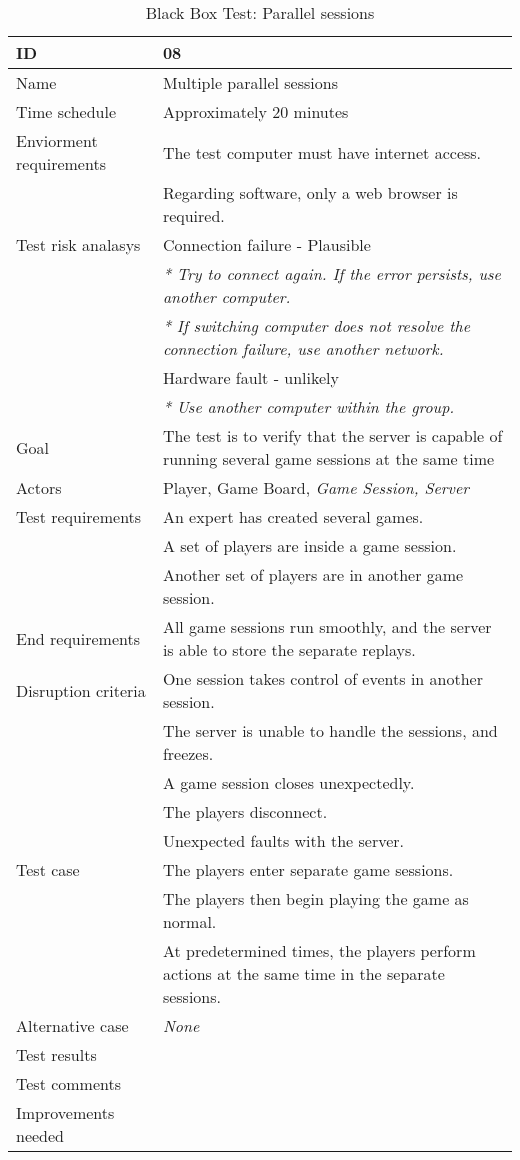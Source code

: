 
{\footnotesize
\begin{table}[H]
\begin{tabular}{| p{5cm} | p{10cm} |}\hline
	\textbf{ID}	& \textbf{08} \\ \hline
	Name		& Multiple parallel sessions\\ \hline
	Time schedule	& Approximately 20 minutes\\ \hline
	Enviorment requirements 
		& The test computer must have internet access. \\
		& Regarding software, only a web browser is required. \\ \hline
	Test risk analasys 
		& Connection failure - Plausible \\
		& \emph{* Try to connect again. If the error persists, use another computer.} \\
		& \emph{* If switching computer does not resolve the connection failure, use another network.}\\
		& Hardware fault - unlikely \\
		& \emph{* Use another computer within the group.} \\ \hline
	Goal	& The test is to verify that the server is capable of running several game sessions at the same time \\ \hline
	Actors	& Player, Game Board, \emph{Game Session, Server} \\ \hline
	Test requirements
		& An expert has created several games.\\
		& A set of players are inside a game session.\\
		& Another set of players are in another game session. \\ \hline
	End requirements 
		& All game sessions run smoothly, and the server is able to store the separate replays.\\ \hline
	Disruption criteria 
		& One session takes control of events in another session.\\
		& The server is unable to handle the sessions, and freezes.\\
		& A game session closes unexpectedly. \\
		& The players disconnect.\\
		& Unexpected faults with the server. \\ \hline
	Test case
		& The players enter separate game sessions.\\
		& The players then begin playing the game as normal.\\
		& At predetermined times, the players perform actions at the same time in the separate sessions.\\ \hline
	Alternative case
		& \emph{None}\\ \hline
	Test results 
		& \\ \hline
	Test comments
		& \\ \hline
	Improvements needed
		& \\ \hline
\end{tabular}


\caption{Black Box Test: Parallel sessions}
\label{fig:black_box_test_8}
\end{table}}

